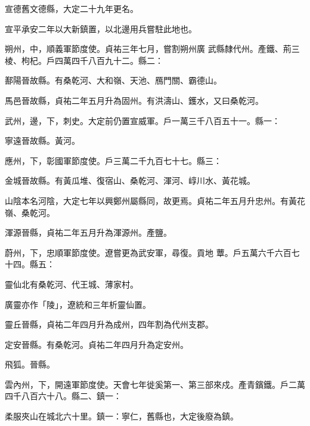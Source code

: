 \begin{pinyinscope}
 宣德舊文德縣，大定二十九年更名。



 宣平承安二年以大新鎮置，以北邊用兵嘗駐此地也。



 朔州，中，順義軍節度使。貞祐三年七月，嘗割朔州廣
 武縣隸代州。產鐵、荊三棱、枸杞。戶四萬四千八百九十二。縣二：



 鄯陽晉故縣。有桑乾河、大和嶺、天池、鴈門關、霸德山。



 馬邑晉故縣，貞祐二年五月升為固州。有洪濤山、鑊水，又曰桑乾河。



 武州，邊，下，刺史。大定前仍置宣威軍。戶一萬三千八百五十一。縣一：



 寧遠晉故縣。黃河。



 應州，下，彰國軍節度使。戶三萬二千九百七十七。縣三：



 金城晉故縣。有黃瓜堆、復宿山、桑乾河、渾河、崞川水、黃花城。



 山陰本名河陰，大定七年以興鄭州屬縣同，故更焉。貞祐二年五月升忠州。有黃花嶺、桑乾河。



 渾源晉縣，貞祐二年五月升為渾源州。產鹽。



 蔚州，下，忠順軍節度使。遼嘗更為武安軍，尋復。貢地
 蕈。戶五萬六千六百七十四。縣五：



 靈仙北有桑乾河、代王城、薄家村。



 廣靈亦作「陵」，遼統和三年析靈仙置。



 靈丘晉縣，貞祐二年四月升為成州，四年割為代州支郡。



 定安晉縣。有桑乾河。貞祐二年四月升為定安州。



 飛狐。晉縣。



 雲內州，下，開遠軍節度使。天會七年徙奚第一、第三部來戍。產青鑌鐵。戶二萬四千八百六十八。縣二、鎮一：



 柔服夾山在城北六十里。鎮一：寧仁，舊縣也，大定後廢為鎮。




\end{pinyinscope}
